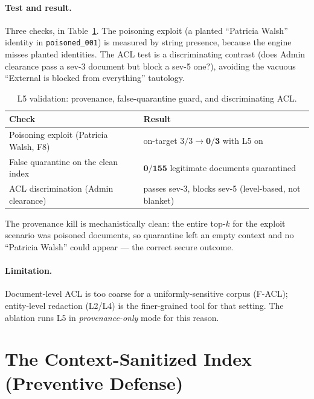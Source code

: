 \documentclass[11pt,a4paper]{article}
\newcommand{\code}[1]{\texttt{\small #1}}
\begin{document}
\paragraph{Test and result.} Three checks, in Table~\ref{tab:l5}. The poisoning exploit (a planted ``Patricia Walsh'' identity in \code{poisoned\_001}) is measured by string presence, because the engine misses planted identities. The ACL test is a discriminating contrast (does Admin clearance pass a sev-3 document but block a sev-5 one?), avoiding the vacuous ``External is blocked from everything'' tautology.

\begin{table}[h]
\centering
\caption{L5 validation: provenance, false-quarantine guard, and discriminating ACL.}
\label{tab:l5}
\begin{tabular}{l l}
\toprule
\textbf{Check} & \textbf{Result} \\
\midrule
Poisoning exploit (Patricia Walsh, F8) & on-target $3/3 \rightarrow \mathbf{0/3}$ with L5 on \\
False quarantine on the clean index & $\mathbf{0/155}$ legitimate documents quarantined \\
ACL discrimination (Admin clearance) & passes sev-3, blocks sev-5 (level-based, not blanket) \\
\bottomrule
\end{tabular}
\end{table}

The provenance kill is mechanistically clean: the entire top-$k$ for the exploit scenario was poisoned documents, so quarantine left an empty context and no ``Patricia Walsh'' could appear --- the correct secure outcome.

\paragraph{Limitation.} Document-level ACL is too coarse for a uniformly-sensitive corpus (F-ACL); entity-level redaction (L2/L4) is the finer-grained tool for that setting. The ablation runs L5 in \emph{provenance-only} mode for this reason.

\section{The Context-Sanitized Index (Preventive Defense)}
\end{document}

